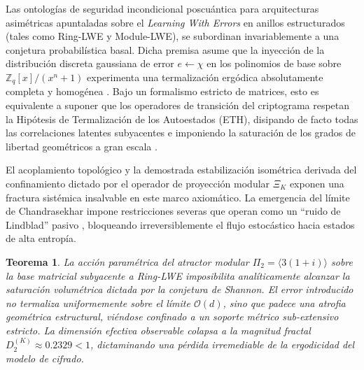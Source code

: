 \documentclass{article}
\numberwithin{equation}{section}
\theoremstyle{plain}
\newtheorem{teorema}{Teorema}[section]
\theoremstyle{definition}
\begin{document}
Las ontologías de seguridad incondicional poscuántica para arquitecturas asimétricas apuntaladas sobre el \textit{Learning With Errors} en anillos estructurados (tales como Ring-LWE y Module-LWE), se subordinan invariablemente a una conjetura probabilística basal. Dicha premisa asume que la inyección de la distribución discreta gaussiana de error $e \gets \chi$ en los polinomios de base sobre $\mathbb{Z}_q[x]/(x^n+1)$ experimenta una termalización ergódica absolutamente completa y homogénea \cite{Peikert2009, Regev2009}. Bajo un formalismo estricto de matrices, esto es equivalente a suponer que los operadores de transición del criptograma respetan la Hipótesis de Termalización de los Autoestados (ETH), disipando de facto todas las correlaciones latentes subyacentes e imponiendo la saturación de los grados de libertad geométricos a gran escala \cite{Pappalardi2023ETH}.

El acoplamiento topológico y la demostrada estabilización isométrica derivada del confinamiento dictado por el operador de proyección modular $\Xi_K$ exponen una fractura sistémica insalvable en este marco axiomático. La emergencia del límite de Chandrasekhar impone restricciones severas que operan como un ``ruido de Lindblad'' pasivo \cite{Khaymovich2021}, bloqueando irreversiblemente el flujo estocástico hacia estados de alta entropía.

\begin{teorema}
\label{teo:violacion_eth_lwe_uniqueqma}
La acción paramétrica del atractor modular $\Pi_2 = \langle 3(1+i) \rangle$ sobre la base matricial subyacente a Ring-LWE imposibilita analíticamente alcanzar la saturación volumétrica dictada por la conjetura de Shannon. El error introducido no termaliza uniformemente sobre el límite $\mathcal{O}(d)$, sino que padece una atrofia geométrica estructural, viéndose confinado a un soporte métrico sub-extensivo estricto. La dimensión efectiva observable colapsa a la magnitud fractal $D_2^{(K)} \approx 0.2329 < 1$, dictaminando una pérdida irremediable de la ergodicidad del modelo de cifrado.
\end{teorema}
\end{document}
